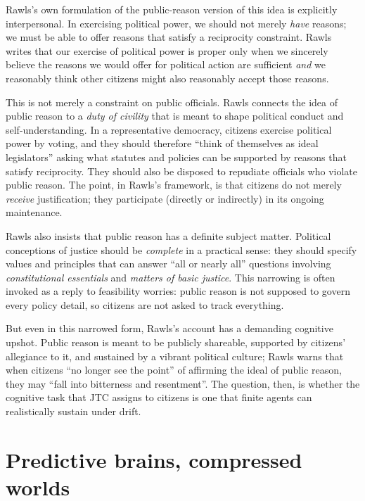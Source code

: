 \documentclass[12pt]{report}
\begin{document}
Rawls's own formulation of the public-reason version of this idea is explicitly interpersonal. In exercising political power, we should not merely \emph{have} reasons; we must be able to offer reasons that satisfy a reciprocity constraint. Rawls writes that our exercise of political power is proper only when we sincerely believe the reasons we would offer for political action are sufficient \emph{and} we reasonably think other citizens might also reasonably accept those reasons. \parencite[pp.~446--447]{rawls2005political}

This is not merely a constraint on public officials. Rawls connects the idea of public reason to a \emph{duty of civility} that is meant to shape political conduct and self-understanding. In a representative democracy, citizens exercise political power by voting, and they should therefore \enquote{think of themselves as ideal legislators} asking what statutes and policies can be supported by reasons that satisfy reciprocity. They should also be disposed to repudiate officials who violate public reason. \parencite[p.~444]{rawls2005political} The point, in Rawls's framework, is that citizens do not merely \emph{receive} justification; they participate (directly or indirectly) in its ongoing maintenance.

Rawls also insists that public reason has a definite subject matter. Political conceptions of justice should be \emph{complete} in a practical sense: they should specify values and principles that can answer \enquote{all or nearly all} questions involving \emph{constitutional essentials} and \emph{matters of basic justice}. \parencite[pp.~453--454]{rawls2005political} This narrowing is often invoked as a reply to feasibility worries: public reason is not supposed to govern every policy detail, so citizens are not asked to track everything.

But even in this narrowed form, Rawls's account has a demanding cognitive upshot. Public reason is meant to be publicly shareable, supported by citizens' allegiance to it, and sustained by a vibrant political culture; Rawls warns that when citizens \enquote{no longer see the point} of affirming the ideal of public reason, they may \enquote{fall into bitterness and resentment}. \parencite[p.~485]{rawls2005political} The question, then, is whether the cognitive task that JTC assigns to citizens is one that finite agents can realistically sustain under drift.

\section{Predictive brains, compressed worlds}
\end{document}
